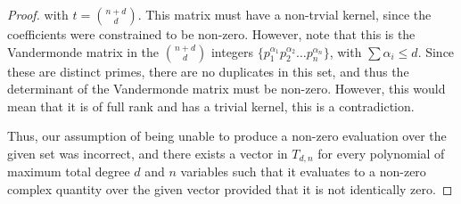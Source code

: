 \begin{proof}
    with \(t = \binom{n+d}{d}\). This matrix must have a non-trvial kernel,
    since the coefficients were constrained to be non-zero. However, note that
    this is the Vandermonde matrix in the \(\binom{n+d}{d}\) integers
    \(\{p_1^{\alpha_1}p_2^{\alpha_2}\ldots p_n^{\alpha_n}\}\), with \(\sum
    \alpha_i \leq d\). Since these are distinct primes, there are no duplicates
    in this set, and thus the determinant of the Vandermonde matrix must be
    non-zero. However, this would mean that it is of full rank and has a trivial
    kernel, this is a contradiction. 
    
    Thus, our assumption of being unable to produce a non-zero
    evaluation over the given set was incorrect, and there exists a vector in
    \(T_{d, n}\) for every polynomial of maximum total degree \(d\) and \(n\)
    variables such that it evaluates to a non-zero complex quantity over the
    given vector provided that it is not identically zero.

\end{proof}
